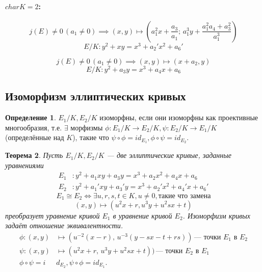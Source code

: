 \documentclass[12pt]{article}
\newtheorem{theorem}{Теорема}
\theoremstyle{definition}
\newtheorem{definition}[theorem]{Определение}
\theoremstyle{definition}
\theoremstyle{definition}
\begin{document}
            \paragraph{$char K = 2$:} 
            \[
            j(E)\neq0 \, (a_1\neq0) \implies (x, y) \mapsto (a_1^2x+\frac{a_3}{a_1}; \, a_1^3y + \frac{a_1^2a_4+a_3^2}{a_1^3})
            \]
            \begin{equation}
                E/K: y^2+xy=x^3+a_2'x^2+a_6'
            \end{equation}
            
            \[
            j(E)\neq0 \, (a_1\neq0) \implies (x, y) \mapsto (x+a_2, y)
            \]
            \begin{equation}
                E/K: y^2+a_3y = x^3+a_4x+a_6
            \end{equation}
            
        \subsection{Изоморфизм эллиптических кривых}
            \begin{definition} 
                $E_1/K, E_2/K$ изоморфны, если они изоморфны как проективные многообразия, т.е. $\exists$ морфизмы $\phi: E_1/K \to E_2/K, \psi: E_2/K \to E_1/K$ (определённые над $K$), такие что $\psi \circ \phi = id_{E_1}, \phi \circ \psi = id_{E_2}$.
            \end{definition}
            
            \begin{theorem}
                Пусть $E_1/K, E_2/K$ — две эллиптические кривые, заданные уравнениями 
                \begin{align}
                    E_1&: y^2+a_1xy + a_3y = x^3 + a_2x^2 + a_4x + a_6 \\ \nonumber
                    E_2&: y^2+a_1'xy + a_3'y = x^3 + a_2'x^2 + a_4'x + a_6'
                \end{align}
                \begin{equation*}
                E_1 \cong E_2 \iff \exists u,r,s,t \in K, u\neq0, \text{такие что замена}
                \end{equation*}
                \begin{equation}
                \label{eq:xytransition}
                    (x,y) \mapsto (u^2x+r, u^3y+ u^2sx+t)
                \end{equation}
                преобразует уравнение кривой $E_1$ в уравнение кривой $E_2$. Изоморфизм кривых задаёт отношение эквивалентности.
                \begin{align*}
                    \phi : (x,y)&\mapsto (u^{-2}(x-r), \,u^{-3}(y-sx-t+rs))\,\text{— точки $E_1$ в $E_2$} \\
                    \psi : (x,y)&\mapsto (u^2x+r, \,u^3y+u^2sx+t))\, \text{— точки $E_2$ в $E_1$} \\
                    \phi \circ \psi = i&d_{E_2}, \psi \circ \phi = id_{E_1}.
                \end{align*}
            \end{theorem}
            
\end{document}
